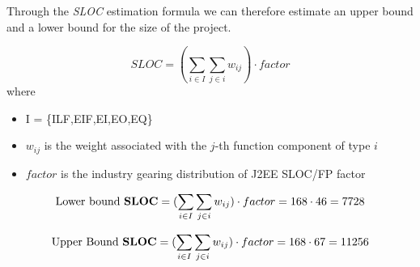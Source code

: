 Through the \emph{SLOC} estimation formula we can therefore estimate an upper bound and a lower bound for the size of the project. 

 $$SLOC = (\sum_{i \in I} \sum_{j \in i} w_{ij}) \cdot factor$$
where 
\begin{itemize}
	\item I = \{ILF,EIF,EI,EO,EQ\}
	\item $w_{ij}$ is the weight associated with the $j$-th function component of type $i$
	\item $factor$ is the industry gearing distribution of J2EE SLOC/FP factor
\end{itemize} 

 $$\textrm{Lower bound \textbf{SLOC}} = (\sum_{i \in I} \sum_{j \in i} w_{ij}) \cdot factor = 168 \cdot 46 = 7728 $$
 
  $$\textrm{Upper Bound \textbf{SLOC}} = (\sum_{i \in I} \sum_{j \in i} w_{ij}) \cdot factor = 168 \cdot 67 =11256 $$